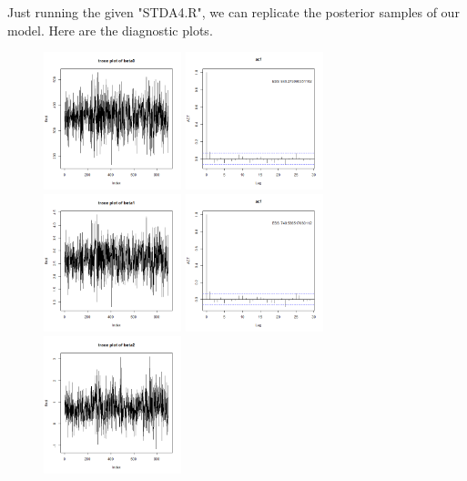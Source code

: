 \documentclass{article}
\begin{document}
\clearpage
Just running the given "STDA4.R", we can replicate the posterior samples of our model.
Here are the diagnostic plots.

\begin{figure}[!h]
    \centering
    \includegraphics[width=4cm]{prob2_beta0_traceplot.png}
    \includegraphics[width=4cm]{prob2_beta0_acf.png}
    \includegraphics[width=4cm]{prob2_beta1_traceplot.png}
    \includegraphics[width=4cm]{prob2_beta1_acf.png} \\
    \includegraphics[width=4cm]{prob2_beta2_traceplot.png}

\end{figure}
\end{document}
